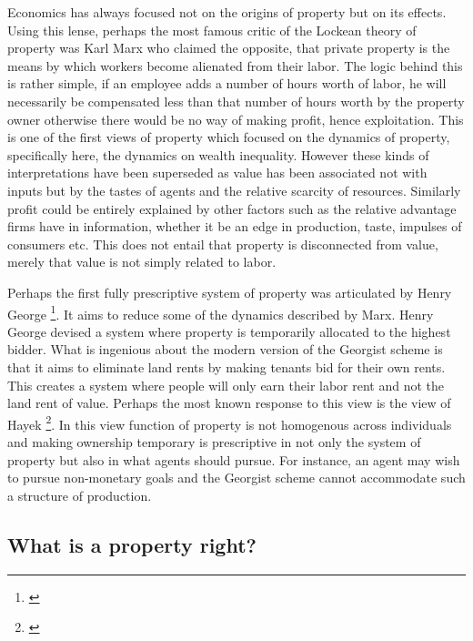 \documentclass[12pt]{article}
\numberwithin{equation}{section}
\begin{document}
Economics has always focused not on the origins of property but on its effects. Using this lense, perhaps the most famous critic of the Lockean theory of property was Karl Marx who claimed the opposite, that private property is the means by which workers become alienated from their labor. The logic behind this is rather simple, if an employee adds a number of hours worth of labor, he will necessarily be compensated less than that number of hours worth by the property owner otherwise there would be no way of making profit, hence exploitation. This is one of the first views of property which focused on the dynamics of property, specifically here, the dynamics on wealth inequality. However these kinds of interpretations have been superseded as value has been associated not with inputs but by the tastes of agents and the relative scarcity of resources. Similarly profit could be entirely explained by other factors such as the relative advantage firms have in information, whether it be an edge in production, taste, impulses of consumers etc. This does not entail that property is disconnected from value, merely that value is not simply related to labor.

Perhaps the first fully prescriptive system of property was articulated by Henry George \footnote{\cite{progress}}. It aims to reduce some of the dynamics described by Marx. Henry George devised a system where property is temporarily allocated to the highest bidder. What is ingenious about the modern version of the Georgist scheme is that it aims to eliminate land rents by making tenants bid for their own rents. This creates a system where people will only earn their labor rent and not the land rent of value. Perhaps the most known response to this view is the view of Hayek \footnote{\cite{Fatal}}. In this view function of property is not homogenous across individuals and making ownership temporary is prescriptive in not only the system of property but also in what agents should pursue. For instance, an agent may wish to pursue non-monetary goals and the Georgist scheme cannot accommodate such a structure of production.



\newpage


\subsection{What is a property right?}
\end{document}
